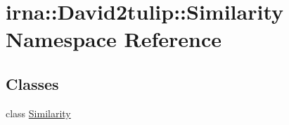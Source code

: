 \hypertarget{namespaceirna_1_1David2tulip_1_1Similarity}{
\section{irna\-:\-:\-David2tulip\-:\-:\-Similarity \-Namespace \-Reference}
\label{namespaceirna_1_1David2tulip_1_1Similarity}
}
\subsection*{\-Classes}
\begin{DoxyCompactItemize}
\item 
class \hyperlink{classirna_1_1David2tulip_1_1Similarity_1_1Similarity}{\-Similarity}
\end{DoxyCompactItemize}
